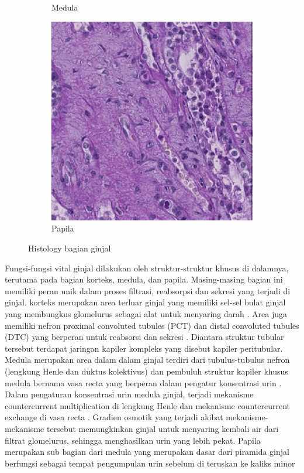 \begin{figure}[H]
\begin{subfigure}[b]{0.3\textwidth}
		\caption{Medula}
		\label{fig:medula}
	\end{subfigure}
	\hfill
	\begin{subfigure}[b]{0.3\textwidth}
		\centering
		\includegraphics[width=\textwidth]{gambar/papila.png}
		\caption{Papila}
		\label{fig:papila}
	\end{subfigure}
	\caption{Histology bagian ginjal}
	\label{fig:ginjal}
\end{figure}

\noindent Fungsi-fungsi vital ginjal dilakukan oleh struktur-struktur khusus di dalamnya, terutama pada bagian korteks, medula, dan papila. Masing-masing bagian ini memiliki peran unik dalam proses filtrasi, reabsorpsi dan sekresi yang terjadi di ginjal. korteks merupakan area terluar ginjal yang memiliki sel-sel bulat ginjal yang membungkus glomelurus sebagai alat untuk menyaring darah \cite{gopalan_renal_2022}. Area juga memiliki nefron proximal convoluted tubules (PCT) dan distal convoluted tubules (DTC) yang berperan untuk reabsorsi dan sekresi \cite{mescher_junqueiras_2021}. Diantara struktur tubular tersebut terdapat jaringan kapiler kompleks yang disebut kapiler peritubular.  Medula merupakan area dalam dalam ginjal terdiri dari tubulus-tubulus nefron (lengkung Henle dan duktus kolektivus) dan pembuluh struktur kapiler khusus medula bernama vasa recta yang berperan dalam pengatur konsentrasi urin \cite{haug_multi-omic_2022}. Dalam pengaturan konsentrasi urin medula ginjal, terjadi mekanisme countercurrent multiplication di lengkung Henle dan mekanisme countercurrent exchange di vasa recta \cite{nankivell_importance_2020}. Gradien osmotik yang terjadi akibat mekanisme-mekanisme tersebut memungkinkan ginjal untuk menyaring kembali air dari filtrat glomelurus, sehingga menghasilkan urin yang lebih pekat. Papila merupakan sub bagian dari medula yang merupakan dasar dari piramida ginjal berfungsi sebagai tempat pengumpulan urin sebelum di teruskan ke kaliks minor \cite{sabate_arroyo_relationship_2020}

